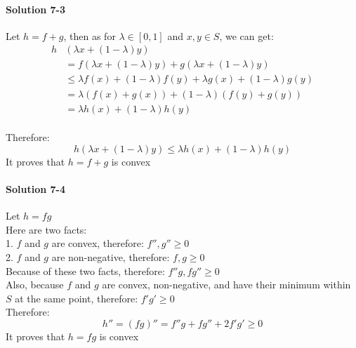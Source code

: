 \documentclass[paper=a4, fontsize=11pt]{scrartcl} %
\numberwithin{equation}{section} %
\numberwithin{figure}{section} %
\numberwithin{table}{section} %
\begin{document}
\paragraph{\textbf{Solution 7-3}}
Let $h=f+g$, then as for $\lambda \in \left [ 0,1 \right ]$ and $x,y\in S$, we can get:
\begin{align*}
h&\left ( \lambda x+\left ( 1-\lambda  \right )y \right )
\\ &=f\left ( \lambda x+\left ( 1-\lambda  \right )y \right )+g\left ( \lambda x+\left ( 1-\lambda  \right )y \right )
\\ &\leqslant \lambda f\left ( x \right )+\left ( 1-\lambda  \right )f\left ( y \right )+\lambda g\left ( x \right )+\left ( 1-\lambda  \right )g\left ( y \right )
\\ &= \lambda\left ( f\left ( x \right ) + g\left ( x \right )\right )+\left (1-\lambda  \right )\left ( f\left ( y \right ) + g\left ( y \right )\right )
\\ &=\lambda h\left ( x \right )+\left ( 1-\lambda  \right )h\left ( y \right )
\end{align*}
\\ Therefore:
\begin{equation*}
h\left ( \lambda x+\left ( 1-\lambda  \right )y \right )\leqslant \lambda h\left ( x \right )+\left ( 1-\lambda  \right )h\left ( y \right )
\end{equation*}
It proves that $h=f+g$ is convex

\paragraph{\textbf{Solution 7-4}}
Let $h=fg$
\\ Here are two facts:
\\ 1. $f$ and $g$ are convex, therefore: ${f}'',{g}''\geqslant 0$
\\ 2. $f$ and $g$ are non-negative, therefore: $f,g\geqslant 0$
\\ Because of these two facts, therefore: ${f}''g,f{g}''\geqslant 0$
\\ Also, because $f$ and $g$ are convex, non-negative, and have their minimum within $S$ at the same point, therefore: ${f}'{g}'\geqslant 0$
\\ Therefore:
\begin{equation*}
{h}''={\left ( fg \right )}''={f}''g+f{g}''+2{f}'{g}'\geqslant 0
\end{equation*}
It proves that $h=fg$ is convex

\end{document}
